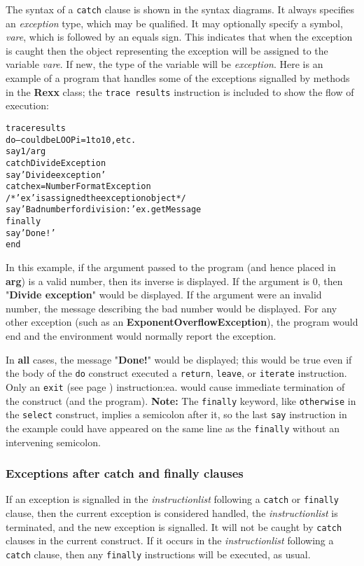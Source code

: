 The syntax of a \texttt{catch} clause is shown in the syntax diagrams.
It always specifies an \emph{exception} type, which may be
qualified.  It may optionally specify a symbol, \emph{vare}, which
is followed by an equals sign.  This indicates that when the exception
is caught then the object representing the exception will be assigned to
the variable \emph{vare}.  If new, the type of the variable will be
\emph{exception}.
 Here is an example of a program that handles some of the exceptions
signalled by methods in the \textbf{Rexx} class; the \texttt{trace
results} instruction is included to show the flow of execution:
\begin{alltt}
trace results
do                -- could be LOOP i=1 to 10, etc.
  say 1/arg
catch DivideException
  say 'Divide exception'
catch ex=NumberFormatException
  /* 'ex' is assigned the exception object */
  say 'Bad number for division:' ex.getMessage
finally
  say 'Done!'
end
\end{alltt}
In this example, if the argument passed to the program (and hence
placed in \textbf{arg}) is a valid number, then its inverse is
displayed.  If the argument is 0, then "\textbf{Divide
exception}" would be displayed.  If the argument were an invalid
number, the message describing the bad number would be displayed.
For any other exception (such as an \textbf{ExponentOverflowException}),
the program would end and the environment would normally report the
exception.
 
In \textbf{all} cases, the message "\textbf{Done!}" would be
displayed; this would be true even if the body of the \texttt{do}
construct executed a \texttt{return}, \texttt{leave}, or
\texttt{iterate} instruction.  Only an  \texttt{exit} (see page \pageref{refexit}) 
instruction:ea. would cause immediate termination of the construct (and
the program).
\textbf{Note: }The \texttt{finally} keyword, like \texttt{otherwise} in the
\texttt{select} construct, implies a semicolon after it, so the last
\texttt{say} instruction in the example could have appeared on the same
line as the \texttt{finally} without an intervening semicolon.
\subsubsection{Exceptions after catch and finally clauses}
 
If an exception is signalled in the \emph{instructionlist} following
a \texttt{catch} or \texttt{finally} clause, then the current exception
is considered handled, the \emph{instructionlist} is terminated, and
the new exception is signalled.  It will not be caught by \texttt{catch}
clauses in the current construct.  If it occurs in the
\emph{instructionlist} following a \texttt{catch} clause, then any
\texttt{finally} instructions will be executed, as usual.
 
